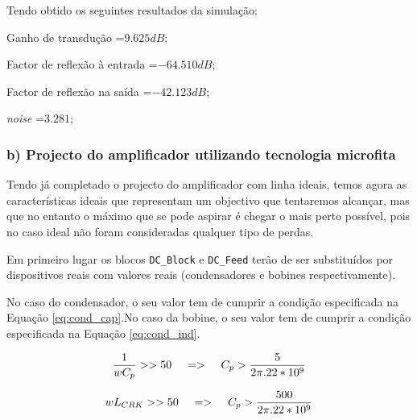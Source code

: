 \documentclass[11pt]{article}
\numberwithin{equation}{section}
\begin{document}

Tendo obtido os seguintes resultados da simulação:
\begin{list}{-}{}
	\item Ganho de transdução =$ 9.625 dB $;
	\item Factor de reflexão à entrada =$ -64.510 dB $;
	\item Factor de reflexão na saída =$ -42.123 dB $;
	\item \textit{noise} =$ 3.281 $;
\end{list}



\subsubsection{b) Projecto do amplificador utilizando tecnologia microfita}

Tendo já completado o projecto do amplificador com linha ideais, temos agora as características ideais que representam um objectivo que tentaremos alcançar, mas que no entanto o máximo que se pode aspirar é chegar o mais perto possível, pois no caso ideal não foram consideradas qualquer tipo de perdas.

Em primeiro lugar os blocos \texttt{DC\_Block} e \texttt{DC\_Feed} terão de ser substituídos por dispositivos reais com valores reais (condensadores e bobines respectivamente). 

No caso do condensador, o seu valor tem de cumprir a condição especificada na Equação \ref{eq:cond_cap}.No caso da bobine, o seu valor tem de cumprir a condição especificada na Equação \ref{eq:cond_ind}.

\begin{equation}
\dfrac{1}{w C_{p}}>>50 \hspace{4mm} => \hspace{4mm}   C_{p}>\dfrac{5}{2 \pi . 22*10^{9}}
\label{eq:cond_cap}
\end{equation}

\begin{equation}
w L_{CRK}>>50 \hspace{4mm} => \hspace{4mm}   C_{p}>\dfrac{500}{2 \pi . 22*10^{9}}
\label{eq:cond_ind}
\end{equation}
\end{document}
